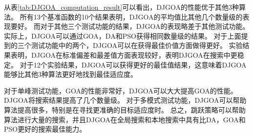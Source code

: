 从表\ref{tab:DJGOA_computation_result}可以看出，DJGOA的性能优于其他3种算法。 所有13个基准函数的10个结果表明，DJGOA的平均值比其他几个数量级的表现要好。 而对于其他三个测试功能的结果，DJGOA的表现略差于其他测试功能。 实际上，DJGOA可以通过GOA，DA和PSO获得相同数量级的结果。 对于上面提到的三个测试功能中的两个，DJGOA可以在获得最佳价值方面做得更好。 实验结果表明，DJGOA在标准偏差和最差值方面表现较好，表明DJGOA在搜索中更稳定。 对于12个实验结果，DJGOA可以获得更好的最佳值结果，这意味着DJGOA能够比其他3种算法更好地找到最佳适应度。  

对于单峰测试功能，GOA的性能非常好，DJGOA可以大大提高GOA的性能。 DJGOA将搜索结果提高了几个数量级。 对于多模式测试功能，DJGOA可以帮助算法提高很多，特别是在寻找更准确的目标适应度时。 总之，跳跃策略可以帮助算法进行大量的搜索，并且DJGOA在全局搜索和本地搜索中具有比DA，GOA和PSO更好的搜索最佳能力。





